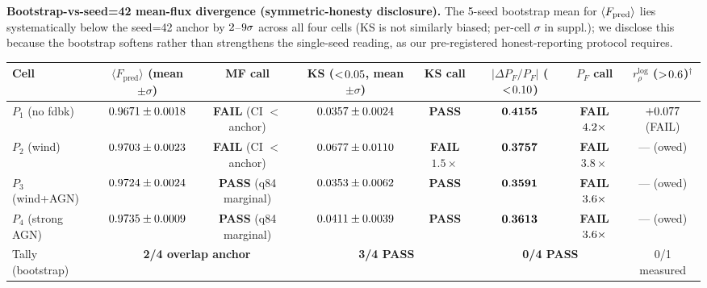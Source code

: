 \textbf{Bootstrap-vs-seed=42 mean-flux divergence (symmetric-honesty disclosure).} The 5-seed bootstrap mean for $\langle F_{\rm pred}\rangle$ lies systematically below the seed=42 anchor by $2$--$9\sigma$ across all four cells (KS is not similarly biased; per-cell $\sigma$ in suppl.); we disclose this because the bootstrap softens rather than strengthens the single-seed reading, as our pre-registered honest-reporting protocol requires.

\begin{table}[t]
    \centering
    \renewcommand{\arraystretch}{1.05}
    \setlength{\tabcolsep}{3.5pt}
    \footnotesize
    \begin{tabular}{l|cc|cc|cc|c}
    Cell & $\langle F_{\text{pred}}\rangle$ (mean $\pm \sigma$) & MF call & KS ($<\!0.05$, mean $\pm \sigma$) & KS call & $|\Delta P_F/P_F|$ ($<\!0.10$) & $P_F$ call & $r_\rho^{\log}$ ($>\!0.6$)$^\dagger$ \\
    \hline
    $P_1$ (no fdbk)     & $0.9671 \pm 0.0018$ & \textbf{FAIL} (CI $<$ anchor) & $0.0357 \pm 0.0024$ & \textbf{PASS} & $\mathbf{0.4155}$ & \textbf{FAIL $4.2\times$} & $+0.077$ (FAIL) \\
    $P_2$ (wind)        & $0.9703 \pm 0.0023$ & \textbf{FAIL} (CI $<$ anchor) & $0.0677 \pm 0.0110$ & \textbf{FAIL $1.5\times$} & $\mathbf{0.3757}$ & \textbf{FAIL $3.8\times$} & --- (owed) \\
    $P_3$ (wind+AGN)    & $0.9724 \pm 0.0024$ & \textbf{PASS} (q84 marginal) & $0.0353 \pm 0.0062$ & \textbf{PASS} & $\mathbf{0.3591}$ & \textbf{FAIL $3.6\times$} & --- (owed) \\
    $P_4$ (strong AGN)  & $0.9735 \pm 0.0009$ & \textbf{PASS} (q84 marginal) & $0.0411 \pm 0.0039$ & \textbf{PASS} & $\mathbf{0.3613}$ & \textbf{FAIL $3.6\times$} & --- (owed) \\
    \hline
    Tally (bootstrap)   & \multicolumn{2}{c|}{\textbf{2/4 overlap anchor}} & \multicolumn{2}{c|}{\textbf{3/4 PASS}} & \multicolumn{2}{c|}{\textbf{0/4 PASS}} & 0/1 measured \\
    \end{tabular}

\end{table}
